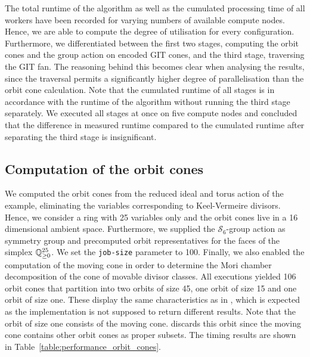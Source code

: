 The total runtime of the algorithm as well as the cumulated processing time of all workers have been recorded for varying numbers of available compute nodes. Hence, we are able to compute the degree of utilisation for every configuration. Furthermore, we differentiated between the first two stages, computing the orbit cones and the group action on encoded GIT cones, and the third stage, traversing the GIT fan. The reasoning behind this becomes clear when analysing the results, since the traversal permits a significantly higher degree of parallelisation than the orbit cone calculation. Note that the cumulated runtime of all stages is in accordance with the runtime of the algorithm without running the third stage separately. We executed all stages at once on five compute nodes and concluded that the difference in measured runtime compared to the cumulated runtime after separating the third stage is insignificant.

\subsection*{Computation of the orbit cones}

We computed the orbit cones from the reduced ideal and torus action of the \msix{} example, eliminating the variables corresponding to Keel-Vermeire divisors. Hence, we consider a ring with 25 variables only and the orbit cones live in a 16 dimensional ambient space. Furthermore, we supplied the $\mathcal{S}_6$-group action as symmetry group and precomputed orbit representatives for the faces of the simplex $\mathbb{Q}_{\geq 0}^{25}$. We set the \texttt{job-size} parameter to 100. Finally, we also enabled the computation of the moving cone in order to determine the Mori chamber decomposition of the cone of movable divisor classes. All executions yielded 106 orbit cones that partition into two orbits of size 45, one orbit of size 15 and one orbit of size one. These display the same characteristics as in \cite[Remark 6.7]{gitfan_symmetry}, which is expected as the \gitfanlib{} implementation is not supposed to return different results. Note that the orbit of size one consists of the moving cone. \gitfanlib{} discards this orbit since the moving cone contains other orbit cones as proper subsets. The timing results are shown in Table~\ref{table:performance_orbit_cones}.

